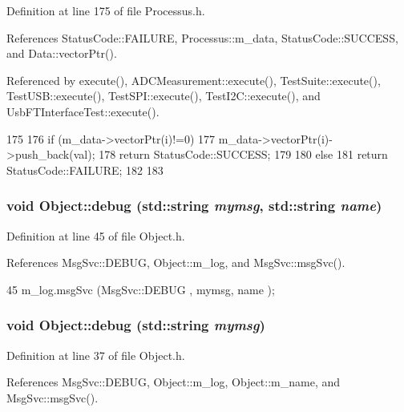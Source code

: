 Definition at line 175 of file Processus.h.

References StatusCode::FAILURE, Processus::m\_\-data, StatusCode::SUCCESS, and Data::vectorPtr().

Referenced by execute(), ADCMeasurement::execute(), TestSuite::execute(), TestUSB::execute(), TestSPI::execute(), TestI2C::execute(), and UsbFTInterfaceTest::execute().


\begin{DoxyCode}
175                                         {
176     if (m_data->vectorPtr(i)!=0){
177       m_data->vectorPtr(i)->push_back(val);
178       return StatusCode::SUCCESS;
179     }
180     else {
181       return StatusCode::FAILURE;
182     }
183   }
\end{DoxyCode}
\hypertarget{classObject_a6c9a0397ca804e04d675ed05683f5420}{
\subsubsection[{debug}]{\setlength{\rightskip}{0pt plus 5cm}void Object::debug (std::string {\em mymsg}, \/  std::string {\em name})}}
\label{classObject_a6c9a0397ca804e04d675ed05683f5420}


Definition at line 45 of file Object.h.

References MsgSvc::DEBUG, Object::m\_\-log, and MsgSvc::msgSvc().


\begin{DoxyCode}
45 { m_log.msgSvc (MsgSvc::DEBUG   , mymsg, name ); }
\end{DoxyCode}
\hypertarget{classObject_aac010553f022165573714b7014a15f0d}{
\subsubsection[{debug}]{\setlength{\rightskip}{0pt plus 5cm}void Object::debug (std::string {\em mymsg})}}
\label{classObject_aac010553f022165573714b7014a15f0d}


Definition at line 37 of file Object.h.

References MsgSvc::DEBUG, Object::m\_\-log, Object::m\_\-name, and MsgSvc::msgSvc().

